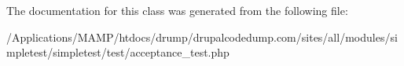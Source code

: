 The documentation for this class was generated from the following file:\begin{DoxyCompactItemize}
\item 
/Applications/MAMP/htdocs/drump/drupalcodedump.com/sites/all/modules/simpletest/simpletest/test/acceptance\_\-test.php\end{DoxyCompactItemize}
